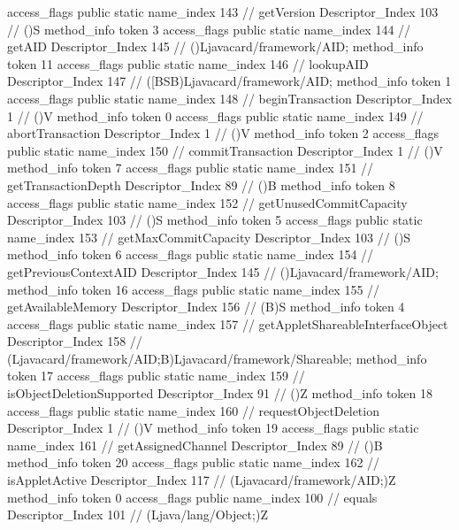 {{{{{					access_flags	public static
					name_index	143		// getVersion
					Descriptor_Index	103		// ()S
				}
				method_info {
					token	3
					access_flags	public static
					name_index	144		// getAID
					Descriptor_Index	145		// ()Ljavacard/framework/AID;
				}
				method_info {
					token	11
					access_flags	public static
					name_index	146		// lookupAID
					Descriptor_Index	147		// ([BSB)Ljavacard/framework/AID;
				}
				method_info {
					token	1
					access_flags	public static
					name_index	148		// beginTransaction
					Descriptor_Index	1		// ()V
				}
				method_info {
					token	0
					access_flags	public static
					name_index	149		// abortTransaction
					Descriptor_Index	1		// ()V
				}
				method_info {
					token	2
					access_flags	public static
					name_index	150		// commitTransaction
					Descriptor_Index	1		// ()V
				}
				method_info {
					token	7
					access_flags	public static
					name_index	151		// getTransactionDepth
					Descriptor_Index	89		// ()B
				}
				method_info {
					token	8
					access_flags	public static
					name_index	152		// getUnusedCommitCapacity
					Descriptor_Index	103		// ()S
				}
				method_info {
					token	5
					access_flags	public static
					name_index	153		// getMaxCommitCapacity
					Descriptor_Index	103		// ()S
				}
				method_info {
					token	6
					access_flags	public static
					name_index	154		// getPreviousContextAID
					Descriptor_Index	145		// ()Ljavacard/framework/AID;
				}
				method_info {
					token	16
					access_flags	public static
					name_index	155		// getAvailableMemory
					Descriptor_Index	156		// (B)S
				}
				method_info {
					token	4
					access_flags	public static
					name_index	157		// getAppletShareableInterfaceObject
					Descriptor_Index	158		// (Ljavacard/framework/AID;B)Ljavacard/framework/Shareable;
				}
				method_info {
					token	17
					access_flags	public static
					name_index	159		// isObjectDeletionSupported
					Descriptor_Index	91		// ()Z
				}
				method_info {
					token	18
					access_flags	public static
					name_index	160		// requestObjectDeletion
					Descriptor_Index	1		// ()V
				}
				method_info {
					token	19
					access_flags	public static
					name_index	161		// getAssignedChannel
					Descriptor_Index	89		// ()B
				}
				method_info {
					token	20
					access_flags	public static
					name_index	162		// isAppletActive
					Descriptor_Index	117		// (Ljavacard/framework/AID;)Z
				}
				method_info {
					token	0
					access_flags	public
					name_index	100		// equals
					Descriptor_Index	101		// (Ljava/lang/Object;)Z
				}
			}
}}}
